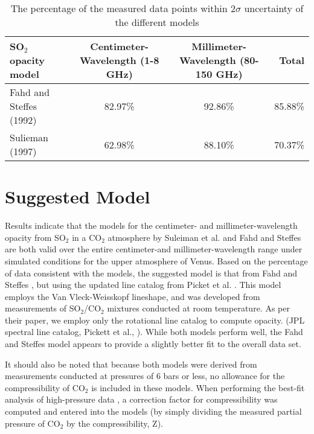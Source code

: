 \begin{sidewaystable}[p]

\caption{The percentage of the measured data points within $2\sigma$ uncertainty of the different models}
  \begin{tabular}{l | c c | r}
  \hline
  \hline
  SO$_2$ opacity model & Centimeter-Wavelength (1-8 GHz) & Millimeter-Wavelength (80-150 GHz) &Total\\
  \hline
  Fahd and Steffes (1992)	 & 82.97\%	& 	92.86\%& 85.88\%\\
  Sulieman (1997)& 62.98\%	&	88.10\%&70.37\%\\
  \hline
  \hline
  \end{tabular}
  \label{tab:model-comp}
\end{sidewaystable}

 


\clearpage

\section{Suggested Model}
Results indicate that the models for the centimeter- and millimeter-wavelength opacity from SO$_2$ in a CO$_2$ atmosphere by Suleiman et al. \cite{Suleiman-1996} and Fahd and Steffes \cite{Fahd-1991} are both valid over the entire centimeter-and millimeter-wavelength range under simulated conditions for the upper atmosphere of Venus. Based on the percentage of data consistent with the models, the suggested model is that from Fahd and Steffes \cite{Fahd-thesis}, but using the updated line catalog from Picket et al. \cite{Pickett-1998}. This model employs the Van Vleck-Weisskopf lineshape, and was developed from measurements of SO$_2$/CO$_2$ mixtures conducted at room temperature. As per their paper, we employ only the rotational line catalog to compute opacity. (JPL spectral line catalog, Pickett et al., \cite{Pickett-1998}). While both models perform well, the Fahd and Steffes \cite{Fahd-1991}  model appears to provide a slightly better fit to the overall data set. 

It should also be noted that because both models were derived from measurements conducted at pressures of 6 bars or less, no allowance for the compressibility of CO$_2$ is included in these models. When performing the best-fit analysis of high-pressure data \cite{Steffes-2014}, a correction factor for compressibility was computed and entered into the models (by simply dividing the measured partial pressure of CO$_2$ by the compressibility, Z). 

